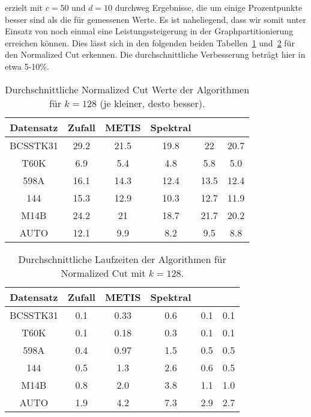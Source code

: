\KCsTwo{} erzielt mit $c=50$ und $d=10$ durchweg Ergebnisse, die um einige Prozentpunkte besser sind als die für \kmpp{}
gemessenen Werte. Es ist naheliegend, dass wir somit unter Einsatz von \KCsTwo{} noch einmal eine Leistungssteigerung
in der Graphpartitionierung erreichen können.
Dies lässt sich in den folgenden beiden Tabellen~\ref{tbl:experiment-coreset-ncut-128}
und~\ref{tbl:experiment-coreset-ncut-runtime-128} für den Normalized Cut erkennen.
Die durchschnittliche Verbesserung beträgt hier in etwa 5-10\%.
\newpage
\begin{table}[h]
\centering
\begin{tabular}{@{}cccccc@{}} \toprule
	\textbf{Datensatz} & \textbf{Zufall} & \textbf{METIS} & \textbf{Spektral} & \textbf{\kkmpp{}} & \textbf{\KCsTwo{}} \\ \midrule
	BCSSTK31 	& 29.2 & 21.5 & 19.8 & 22 & 20.7  \\
	T60K 		& 6.9 & 5.4 & 4.8 & 5.8 & 5.0 \\
	598A 		& 16.1 & 14.3 & 12.4 & 13.5 & 12.4  \\
	144 		& 15.3 & 12.9 & 10.3 & 12.7 & 11.9  \\
	M14B 		& 24.2 & 21 & 18.7 & 21.7 & 20.2  \\
	AUTO 		& 12.1 & 9.9 & 8.2 & 9.5 & 8.8  \\
	\bottomrule
\end{tabular}
\caption{Durchschnittliche Normalized Cut Werte der Algorithmen für $k = 128$ (je kleiner, desto besser).}
\label{tbl:experiment-coreset-ncut-128}
\end{table}

\begin{table}[h]
\centering
\begin{tabular}{@{}cccccc@{}} \toprule
	\textbf{Datensatz} & \textbf{Zufall} & \textbf{METIS} & \textbf{Spektral} & \textbf{\kkmpp{}} &  \textbf{\KCsTwo{}} \\ \midrule
	BCSSTK31 	& 0.1 & 0.33 & 0.6 & 0.1 & 0.1 \\
	T60K 		& 0.1 & 0.18 & 0.3 & 0.1 & 0.1 \\
	598A 		& 0.4 & 0.97 & 1.5 & 0.5 & 0.5 \\
	144 		& 0.5 & 1.3 & 2.6 & 0.6 & 0.5 \\
	M14B 		& 0.8 & 2.0 & 3.8 & 1.1 & 1.0 \\
	AUTO 		& 1.9 & 4.2 & 7.3 & 2.9 & 2.7 \\
	\bottomrule
\end{tabular}
\caption{Durchschnittliche Laufzeiten der Algorithmen für Normalized Cut mit $k = 128$.}
\label{tbl:experiment-coreset-ncut-runtime-128}
\end{table}